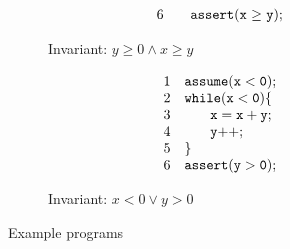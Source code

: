 \begin{figure}[t]
\begin{subfigure}{0.5\textwidth}
\[\begin{array}{ll}
6 & \code{~~~assert(x~{\geq}~y);}
\end{array}
\]
    \caption{Invariant: $y \geq 0 \land x \geq y$}
  \end{subfigure}%
   \begin{subfigure}{0.5\textwidth}
     \vspace{0.3cm}
      \[
      \begin{array}{ll}
      1 & \code{assume(x < 0);} \\
      2 & \code{while(x < 0)\{}  \\
      3 & \code{~~~ \quad x = x + y;}  \\
      4 & \code{~~~ \quad y{++};}  \\
      5 & \code{\}} \\
      6 & \code{assert(y > 0);}
      \end{array}
      \]
    \caption{Invariant: $x < 0 \lor y > 0$}
   \end{subfigure}
\caption{Example programs}
\label{fig:running:example}
\end{figure}

